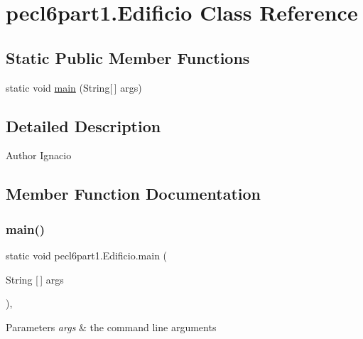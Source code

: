 \hypertarget{classpecl6part1_1_1_edificio}{}\section{pecl6part1.\+Edificio Class Reference}
\label{classpecl6part1_1_1_edificio}
\subsection*{Static Public Member Functions}
\begin{DoxyCompactItemize}
\item 
static void \mbox{\hyperlink{classpecl6part1_1_1_edificio_a3ab3237dc13e14c3abc45fcb507362da}{main}} (String\mbox{[}$\,$\mbox{]} args)
\end{DoxyCompactItemize}


\subsection{Detailed Description}
\begin{DoxyAuthor}{Author}
Ignacio 
\end{DoxyAuthor}


\subsection{Member Function Documentation}
\mbox{\label{classpecl6part1_1_1_edificio_a3ab3237dc13e14c3abc45fcb507362da}} 
\subsubsection{\texorpdfstring{main()}{main()}}
{\footnotesize\ttfamily static void pecl6part1.\+Edificio.\+main (\begin{DoxyParamCaption}\item[{String \mbox{[}$\,$\mbox{]}}]{args }\end{DoxyParamCaption})\hspace{0.3cm}{\ttfamily [inline]}, {\ttfamily [static]}}


\begin{DoxyParams}{Parameters}
{\em args} & the command line arguments \\
\hline
\end{DoxyParams}

